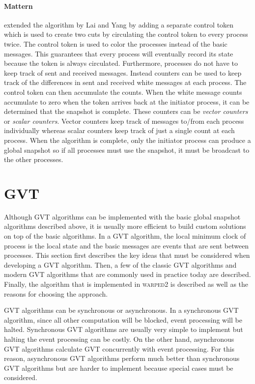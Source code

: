 \documentclass[11pt]{book}
\begin{document}
\paragraph{Mattern} \cite{mattern-93} extended the algorithm by Lai and Yang by adding a separate
control token which is used to create two cuts by circulating the control token to every process
twice.  The control token is used to color the processes instead of the basic messages.  This
guarantees that every process will eventually record its state because the token is always
circulated.  Furthermore, processes do not have to keep track of sent and received messages.
Instead counters can be used to keep track of the differences in sent and received white messages at
each process.  The control token can then accumulate the counts.  When the white message counts
accumulate to zero when the token arrives back at the initiator process, it can be determined that
the snapshot is complete.  These counters can be \emph{vector counters} or \emph{scalar counters}.
Vector counters keep track of messages to/from each process individually whereas scalar counters
keep track of just a single count at each process.  When the algorithm is complete, only the
initiator process can produce a global snapshot so if all processes must use the snapshot, it must
be broadcast to the other processes.

\section{GVT}

Although GVT algorithms can be implemented with the basic global snapshot algorithms described
above, it is usually more efficient to build custom solutions on top of the basic algorithms.  In a
GVT algorithm, the local minimum clock of process is the local state and the basic messages are
events that are sent between processes.  This section first describes the key ideas that must be
considered when developing a GVT algorithm.  Then, a few of the classic GVT algorithms and modern
GVT algorithms that are commonly used in practice today are described.  Finally, the algorithm that
is implemented in \textsc{warped2} is described as well as the reasons for choosing the approach.

GVT algorithms can be synchronous or asynchronous.  In a synchronous GVT algorithm, since all other
computation will be blocked, event processing will be halted.  Synchronous GVT algorithms are
usually very simple to implement but halting the event processing can be costly.  On the other hand,
asynchronous GVT algorithms calculate GVT concurrently with event processing.  For this reason,
asynchronous GVT algorithms perform much better than synchronous GVT algorithms but are harder to
implement because special cases must be considered.
\end{document}
